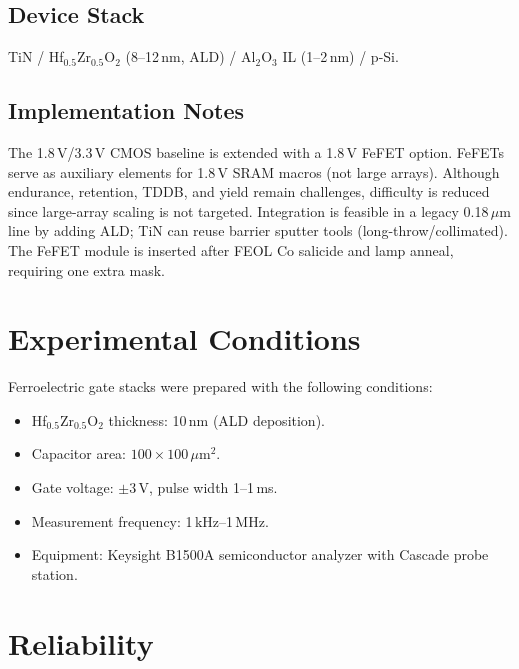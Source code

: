 \documentclass[journal]{IEEEtran}
\begin{document}
\subsection*{Device Stack}
TiN / Hf$_{0.5}$Zr$_{0.5}$O$_2$ (8--12\,nm, ALD) / Al$_2$O$_3$ IL (1--2\,nm) / p-Si.

\subsection*{Implementation Notes}
The 1.8\,V/3.3\,V CMOS baseline is extended with a 1.8\,V FeFET option. FeFETs serve as auxiliary elements for 1.8\,V SRAM macros (not large arrays). Although endurance, retention, TDDB, and yield remain challenges, difficulty is reduced since large-array scaling is not targeted. Integration is feasible in a legacy 0.18\,$\mu$m line by adding ALD; TiN can reuse barrier sputter tools (long-throw/collimated). The FeFET module is inserted after FEOL Co salicide and lamp anneal, requiring one extra mask.

\FloatBarrier

\section{Experimental Conditions}
Ferroelectric gate stacks were prepared with the following conditions:
\begin{itemize}
  \item Hf$_{0.5}$Zr$_{0.5}$O$_2$ thickness: 10\,nm (ALD deposition).
  \item Capacitor area: $100\times100\,\mu\mathrm{m}^2$.
  \item Gate voltage: $\pm 3$\,V, pulse width 1--1\,ms.
  \item Measurement frequency: 1\,kHz--1\,MHz.
  \item Equipment: Keysight B1500A semiconductor analyzer with Cascade probe station.
\end{itemize}

\FloatBarrier

\section{Reliability}
\end{document}
